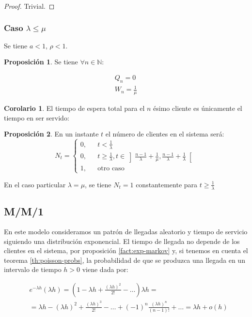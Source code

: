 \documentclass[a4paper,10pt]{scrartcl}
\theoremstyle{definition}
\newtheorem*{fact*}{Proposición}
\newtheorem*{corollary*}{Corolario}
\numberwithin{equation}{section}
\begin{document}
\begin{proof}
 Trivial.
\end{proof}


\subsubsection{Caso $\lambda \le \mu$}

Se tiene $a < 1$, $\rho < 1$.

\begin{fact*}
Se tiene $\forall n\in \mathbb{N}$:

\begin{align*}
Q_n = 0\\
W_n = \frac{1}{\mu}
\end{align*}
\end{fact*}

\begin{corollary*}
 El tiempo de espera total para el $n$ ésimo cliente es únicamente el tiempo en ser servido:
 
 
\end{corollary*}

\begin{fact*}
 En un instante $t$ el número de clientes en el sistema será: 
 \[N_t = \left\{\begin{array}{lcc}
          0, && t < \frac{1}{\lambda}\\
          0, && t \ge \frac{1}{\lambda}, t \in \left]\frac{n-1}{\lambda} + \frac{1}{\mu}, \frac{n-1}{\lambda} + \frac{1}{\lambda}\right[\\
          1, && \text{otro caso}
         \end{array}\right.\]
\end{fact*}

En el caso particular $\lambda = \mu$, se tiene $N_t = 1$ constantemente para $t\ge \frac{1}{\lambda}$

\subsection{M/M/1}

En este modelo consideramos un patrón de llegadas aleatorio y tiempo de servicio siguiendo una distribución 
exponencial. El tiempo de llegada no depende de los clientes en el sistema, por proposición \ref{fact:exp-markov}
y, si tenemos en cuenta el teorema \ref{th:poisson-probs}, la probabilidad de que se produzca una llegada 
en un intervalo de tiempo $h>0$ viene dada por:

\begin{align*}
& e^{-\lambda h}(\lambda h)= \left(1-\lambda h+\frac{(\lambda h)^2}{2!}- \dots\right) \lambda h = \\
& =\lambda h-(\lambda h)^2+\frac{(\lambda h)^3}{2!}-\dots+(-1)^n\frac{(\lambda h)^n}{(n-1)!} + \ldots = \lambda h+o(h)
\end{align*}
\end{document}
